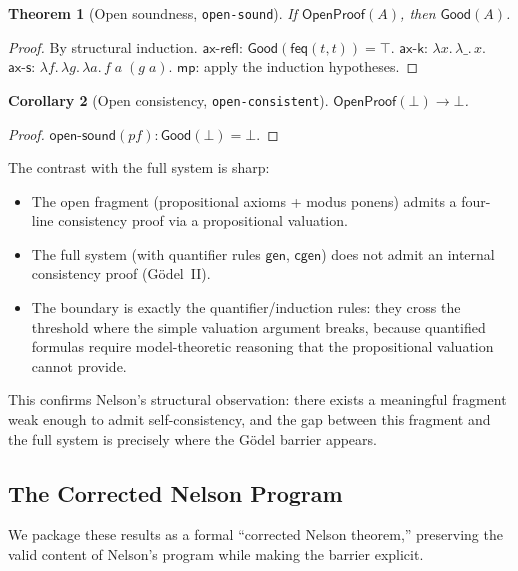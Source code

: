 \documentclass[11pt]{article}
\newtheorem{theorem}{Theorem}[section]
\newtheorem{corollary}[theorem]{Corollary}
\newcommand{\fbot}{\bot}
\begin{document}
\begin{theorem}[Open soundness, \texttt{open-sound}]
If\/ $\mathsf{OpenProof}(A)$, then $\mathsf{Good}(A)$.
\end{theorem}

\begin{proof}
By structural induction.
$\mathsf{ax\text{-}refl}$: $\mathsf{Good}(\mathsf{feq}(t,t)) = \top$.
$\mathsf{ax\text{-}k}$: $\lambda x.\, \lambda \_.\, x$.
$\mathsf{ax\text{-}s}$: $\lambda f.\, \lambda g.\, \lambda a.\, f\;a\;(g\;a)$.
$\mathsf{mp}$: apply the induction hypotheses.
\end{proof}

\begin{corollary}[Open consistency, \texttt{open-consistent}]
$\mathsf{OpenProof}(\fbot) \to \bot$.
\end{corollary}

\begin{proof}
$\mathsf{open\text{-}sound}(\mathit{pf}) : \mathsf{Good}(\fbot) = \bot$.
\end{proof}

The contrast with the full system is sharp:
\begin{itemize}
\item The open fragment (propositional axioms + modus ponens) admits a
  four-line consistency proof via a propositional valuation.
\item The full system (with quantifier rules $\mathsf{gen}$, $\mathsf{cgen}$)
  does not admit an internal consistency proof (G\"odel~II).
\item The boundary is exactly the quantifier/induction rules: they cross
  the threshold where the simple valuation argument breaks, because
  quantified formulas require model-theoretic reasoning that the
  propositional valuation cannot provide.
\end{itemize}

This confirms Nelson's structural observation: there exists a meaningful
fragment weak enough to admit self-consistency, and the gap between this
fragment and the full system is precisely where the G\"odel barrier appears.

\subsection{The Corrected Nelson Program}

We package these results as a formal ``corrected Nelson theorem,''
preserving the valid content of Nelson's program while making the
barrier explicit.
\end{document}

